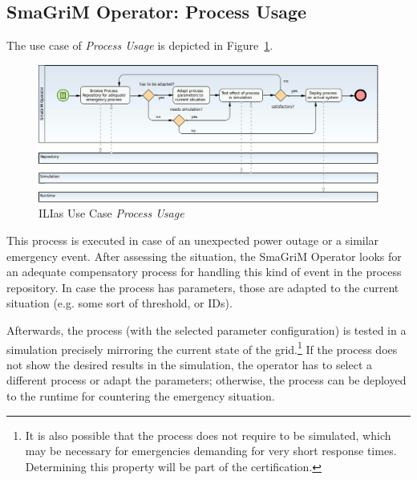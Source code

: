 
\subsection{SmaGriM Operator: Process Usage}

The use case of \emph{Process Usage} is depicted in Figure~\ref{fig:ilias-proc-usage}.

\begin{figure}[ht]
	\includegraphics[width=1\textwidth]{ilias/bpmn_ilias-3.png}
	\caption{ILIas Use Case \emph{Process Usage}}
	\label{fig:ilias-proc-usage}
\end{figure}

This process is executed in case of an unexpected power outage or a similar
emergency event.  After assessing the situation, the SmaGriM Operator looks for
an adequate compensatory process for handling this kind of event in the process
repository.  In case the process has parameters, those are adapted to the current
situation (e.g. some sort of threshold, or IDs).

Afterwards, the process (with the selected parameter configuration) is tested in
a simulation precisely mirroring the current state of the grid.\footnote{It is
also possible that the process does not require to be simulated, which may be
necessary for emergencies demanding for very short response times.  Determining
this property will be part of the certification.} If the process does not show
the desired results in the simulation, the operator has to select a different
process or adapt the parameters; otherwise, the process can be deployed to the
runtime for countering the emergency situation.




